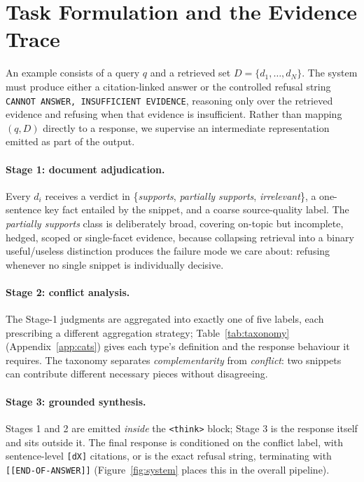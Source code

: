 \section{Task Formulation and the Evidence Trace}
\label{sec:method}

An example consists of a query $q$ and a retrieved set $D=\{d_1,\dots,d_N\}$. The
system must produce either a citation-linked answer or the controlled refusal
string \texttt{CANNOT ANSWER, INSUFFICIENT EVIDENCE}, reasoning only over the
retrieved evidence and refusing when that evidence is insufficient. Rather than
mapping $(q,D)$ directly to a response, we supervise an intermediate
representation emitted as part of the output.

\paragraph{Stage 1: document adjudication.} Every $d_i$ receives a verdict in
\{\textit{supports}, \textit{partially supports}, \textit{irrelevant}\}, a
one-sentence key fact entailed by the snippet, and a coarse source-quality label.
The \textit{partially supports} class is deliberately broad, covering on-topic
but incomplete, hedged, scoped or single-facet evidence, because collapsing
retrieval into a binary useful/useless distinction produces the failure mode we
care about: refusing whenever no single snippet is individually decisive.

\paragraph{Stage 2: conflict analysis.} The Stage-1 judgments are aggregated into
exactly one of five labels, each prescribing a different aggregation strategy;
Table~\ref{tab:taxonomy} (Appendix~\ref{app:cats}) gives each type's definition
and the response behaviour it requires. The taxonomy separates
\emph{complementarity} from \emph{conflict}: two snippets can contribute
different necessary pieces without disagreeing.

\paragraph{Stage 3: grounded synthesis.} Stages 1 and 2 are emitted \emph{inside}
the \verb|<think>| block; Stage 3 is the response itself and sits outside it. The
final response is conditioned on the conflict label, with sentence-level
\texttt{[dX]} citations, or is the exact refusal string, terminating with
\verb|[[END-OF-ANSWER]]| (Figure~\ref{fig:system} places this in the overall
pipeline).

